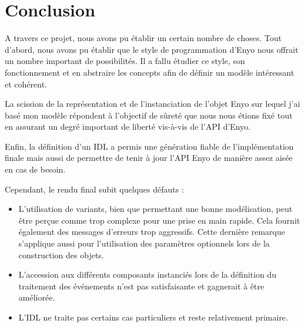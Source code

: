 \documentclass[11pt,a4paper]{report}
\begin{document}
\chapter{Conclusion}

%

A travers ce projet, nous avons pu établir un certain nombre de choses.
Tout d'abord, nous avons pu établir que le style de programmation d'Enyo nous offrait
un nombre important de possibilités. Il a fallu étudier ce style, son fonctionnement et 
en abstraire les concepts afin de définir un modèle intéressant et cohérent.

La scission de la représentation et de l'instanciation de l'objet Enyo sur lequel j'ai basé mon modèle
répondent à l'objectif de sûreté que nous nous étions fixé tout en assurant un degré important
de liberté vis-à-vis de l'API d'Enyo.

Enfin, la définition d'un IDL a permis une génération fiable de l'implémentation finale mais aussi de 
permettre de tenir à jour l'API Enyo de manière assez aisée en cas de besoin.

Cependant, le rendu final subit quelques défauts : 
\begin{itemize}
\item L'utilisation de variants, bien que permettant 
  une bonne modélisation, peut être perçue comme trop complexe pour une prise en main rapide. Cela fournit
  également des messages d'erreurs trop aggressifs. 
  Cette dernière remarque s'applique aussi pour l'utilisation des paramètres optionnels lors de la
  construction des objets.
\item L'accession aux différents composants instanciés lors de la définition du traitement 
  des événements n'est pas satisfaisante et gagnerait à être améliorée.
\item L'IDL ne traite pas certains cas particuliers et reste relativement primaire.    
\end{itemize}\medskip
\end{document}
